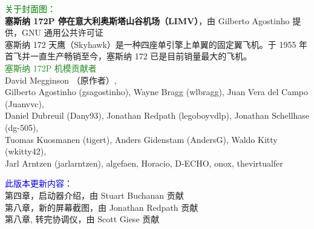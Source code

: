 


\ifchinese
\date{FlightGear 手册\\
\today\\
适用于 \FlightGear{} \version{} 版\\
\small 佟辉（中文翻译）}
\fi

\maketitle
\noindent \small \textcolor{green}{关于封面图：}\\
\textbf{塞斯纳 172P 停在意大利奥斯塔山谷机场（LIMV）}，由 Gilberto Agostinho 提供，GNU 通用公共许可证\\

\noindent 塞斯纳 172 天鹰（Skyhawk）是一种四座单引擎上单翼的固定翼飞机。于 1955 年首飞并一直生产畅销至今，塞斯纳 172 已是目前销量最大的飞机。\\

\noindent \textcolor{ForestGreen}{塞斯纳 172P 机模贡献者}\\
David Megginson （原作者）,\\
Gilberto Agostinho (gsagostinho), Wayne Bragg (wlbragg), Juan Vera del Campo (Juanvvc),\\
Daniel Dubreuil (Dany93), Jonathan Redpath (legoboyvdlp), Jonathan Schellhase (dg-505),\\
Tuomas Kuosmanen (tigert), Anders Gidenstam (AndersG), Waldo Kitty (wkitty42),\\
Jarl Arntzen (jarlarntzen), algefaen, Horacio, D-ECHO, onox, thevirtualfer
\vskip 5cm

\noindent \textcolor{blue}{此版本更新内容：}\\
第四章，启动器介绍，由 Stuart Buchanan 贡献\\
第八章，新的屏幕截图，由 Jonathan Redpath 贡献\\
第八章, 转完协调仪，由 Scott Giese 贡献\\


\tableofcontents

